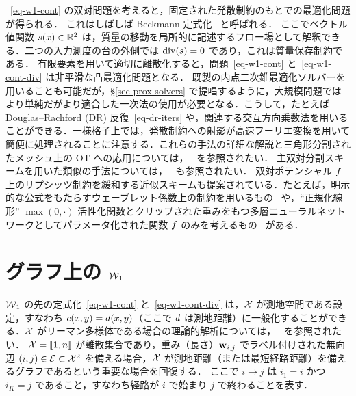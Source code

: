 ~\eqref{eq-w1-cont} の双対問題を考えると，固定された発散制約のもとでの最適化問題が得られる．
これはしばしば Beckmann 定式化~\citep{Beckmann52} と呼ばれる．
%
ここでベクトル値関数 $s(x) \in \mathbb{R}^2$ は，質量の移動を局所的に記述するフロー場として解釈できる．二つの入力測度の台の外側では $\operatorname{div}(s)=0$ であり，これは質量保存制約である．
%
有限要素を用いて適切に離散化すると，問題~\eqref{eq-w1-cont} と~\eqref{eq-w1-cont-div} は非平滑な凸最適化問題となる．
%
既製の内点二次錐最適化ソルバーを用いることも可能だが，\S\ref{sec-prox-solvers} で提唱するように，大規模問題ではより単純だがより適合した一次法の使用が必要となる．こうして，たとえば Douglas--Rachford (DR) 反復~\eqref{eq-dr-iters} や，関連する交互方向乗数法を用いることができる．一様格子上では，発散制約への射影が高速フーリエ変換を用いて簡便に処理されることに注意する．これらの手法の詳細な解説と三角形分割されたメッシュ上の OT への応用については，~\citet{SolomonEMDSurfaces2014} を参照されたい．
%
主双対分割スキームを用いた類似の手法については，~\citet{LiRyuOsherYinGangbo2017_parallel,Ryu2017a,Ryu2017b} も参照されたい．
%
双対ポテンシャル $f$ 上のリプシッツ制約を緩和する近似スキームも提案されている．たとえば，明示的な公式をもたらすウェーブレット係数上の制約を用いるもの~\citep{shirdhonkar2008approximate} や，``正規化線形'' $\max(0,\cdot)$ 活性化関数とクリップされた重みをもつ多層ニューラルネットワークとしてパラメータ化された関数 $f$ のみを考えるもの~\citep{WassersteinGAN} がある．



\section{グラフ上の $\operatorname{\mathcal{W}}_1$}

$\operatorname{\mathcal{W}}_1$ の先の定式化~\eqref{eq-w1-cont} と~\eqref{eq-w1-cont-div} は，$\mathcal{X}$ が測地空間である設定，すなわち $c(x,y)=d(x,y)$（ここで $d$ は測地距離）に一般化することができる．$\mathcal{X}$ がリーマン多様体である場合の理論的解析については，~\citet{FeldmanMacCann02} を参照されたい．
%
$\mathcal{X}=\llbracket1,n\rrbracket$ が離散集合であり，重み（長さ）$\mathrm{\textbf{w}}_{i,j}$ でラベル付けされた無向辺 $(i,j) \in \mathcal{E} \subset \mathcal{X}^2$ を備える場合，$\mathcal{X}$ が測地距離（または最短経路距離）を備えるグラフであるという重要な場合を回復する．
ここで $i \rightarrow j$ は $i_1=i$ かつ $i_K=j$ であること，すなわち経路が $i$ で始まり $j$ で終わることを表す．

